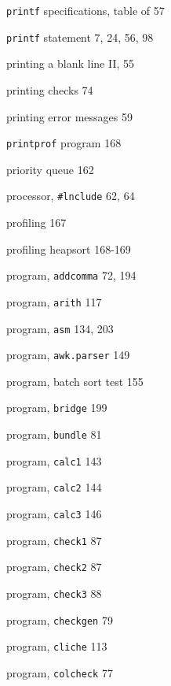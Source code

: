 \begin{multicols}{3}

\hangindent=3pc  \verb'printf' specifications, table of 57


\hangindent=3pc  \verb'printf' statement 7, 24, 56, 98

\hangindent=3pc  printing a blank line II, 55

\hangindent=3pc  printing checks 74

\hangindent=3pc  printing error messages 59

\hangindent=3pc  \verb'printprof' program 168

\hangindent=3pc  priority queue 162

\hangindent=3pc  processor, \verb'#lnclude' 62, 64

\hangindent=3pc  profiling 167

\hangindent=3pc  profiling heapsort 168-169

\hangindent=3pc  program, \verb'addcomma' 72, 194

\hangindent=3pc  program, \verb'arith' 117

\hangindent=3pc  program, \verb'asm' 134, 203

\hangindent=3pc  program, \verb'awk.parser' 149

\hangindent=3pc  program, batch sort test 155

\hangindent=3pc  program, \verb'bridge' 199

\hangindent=3pc  program, \verb'bundle' 81

\hangindent=3pc  program, \verb'calc1' 143

\hangindent=3pc  program, \verb'calc2' 144

\hangindent=3pc  program, \verb'calc3' 146

\hangindent=3pc  program, \verb'check1' 87

\hangindent=3pc  program, \verb'check2' 87

\hangindent=3pc  program, \verb'check3' 88

\hangindent=3pc  program, \verb'checkgen' 79

\hangindent=3pc  program, \verb'cliche' 113

\hangindent=3pc  program, \verb'colcheck' 77


\end{multicols}
